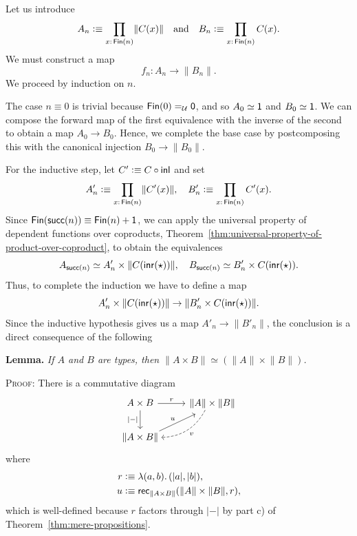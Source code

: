 \begin{solution}
    Let us introduce
    \[
        A_n\defeq\prod_{x\colon\fun{Fin}(n)}\lVert C(x)\rVert
        \quad\text{and}\quad
        B_n\defeq\prod_{x\colon\fun{Fin}(n)}C(x).
    \]
    We must construct a map
    \[
        f_n\colon A_n\to\lVert B_n\rVert.
    \]
    We proceed by induction on $n$.
    
    The case $n\equiv0$ is trivial because $\mathsf{Fin}(0)\mathrel{=_{\mathcal U}}\mathsf{0}$, and so $A_0\simeq\mathsf{1}$ and $B_0\simeq\mathsf{1}$. We can compose the forward map of the first equivalence with the inverse of the second to obtain a map $A_0\to B_0$. Hence, we complete the base case by postcomposing this with the canonical injection $B_0\to\lVert B_0\rVert$.

    For the inductive step, let $C'\mathrel{\vcentcolon}\equiv C\circ\mathsf{inl}$ and set
    \[
        A'_n\defeq\prod_{x\colon\fun{Fin}(n)}\lVert C'(x)\rVert,
        \quad
        B'_n\defeq\prod_{x\colon\fun{Fin}(n)}C'(x).
    \]
    Since $\mathsf{Fin}(\mathsf{succ}(n))\equiv\mathsf{Fin}(n)+\mathsf{1}$, we can apply the universal property of dependent functions over coproducts, Theorem~\ref{thm:universal-property-of-product-over-coproduct}, to obtain the equivalences
    \[
        A_{\mathsf{succ}(n)}\simeq A'_n\times\lVert C(\mathsf{inr}({\mathsf{\star}}))\rVert,
        \quad
        B_{\mathsf{succ}(n)}\simeq B'_n\times C(\mathsf{inr}({\mathsf{\star}})).
    \]
    Thus, to complete the induction we have to define a map
    \[
        A'_n\times\lVert C(\mathsf{inr}({\mathsf{\star}}))\rVert\to
        \lVert B'_n\times C(\mathsf{inr}({\mathsf{\star}}))\rVert.
    \]
    Since the inductive hypothesis gives us a map $A'_n\to\lVert B'_n\rVert$, the conclusion is a direct consequence of the following

    \textbf{Lemma.} {\itshape If\/ $A$ and\/ $B$ are types, then\/ $\lVert A\times B\rVert\simeq(\lVert A\rVert\times\lVert B\rVert)$.}

    \textsc{Proof:} There is a commutative diagram
    \[
        \begin{tikzcd}
            A\times B
                \arrow[r,"r"]
                \arrow[d,"\lvert-\rvert"']
            &\lVert A\rVert\times\lVert B\rVert
                \arrow[ld,"v",dashed,bend left,shift right]\\
            \lVert A\times B\rVert
                \arrow[ru,"u",shift right]
        \end{tikzcd}
    \]
    where
    \begin{align*}
        r&\mathrel{\vcentcolon}\equiv\lambda(a,b).\,(\lvert a\rvert,\lvert b\rvert),\\
        u&\mathrel{\vcentcolon}\equiv\mathsf{rec}_{\lVert A\times B\rVert}
            (
                \lVert A\rVert\times\lVert B\rVert,r
            ),
    \end{align*}
    which is well-defined because $r$ factors through $\lvert-\rvert$ by part c) of Theorem~\ref{thm:mere-propositions}.


\end{solution}
